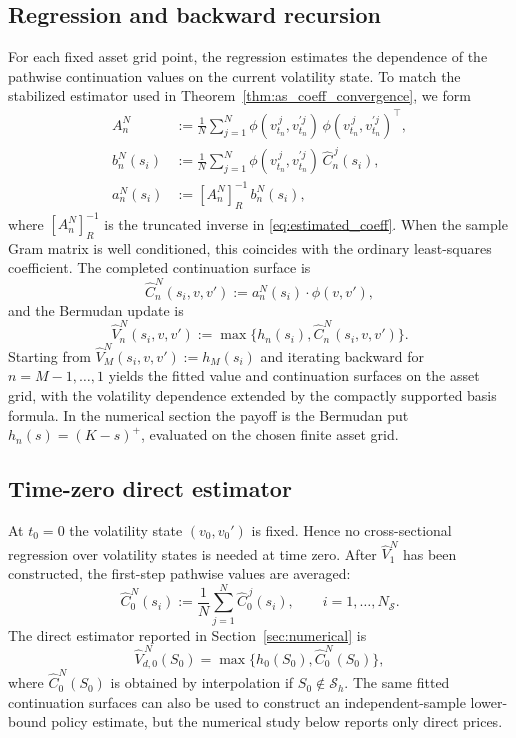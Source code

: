 \documentclass[pdflatex,sn-mathphys-num]{sn-jnl}
\theoremstyle{thmstyleone}%
\theoremstyle{thmstylethree}%
\theoremstyle{thmstyletwo}%
\begin{document}
\subsection{Regression and backward recursion}
For each fixed asset grid point, the regression estimates the dependence of the pathwise continuation values on the current volatility state. To match the stabilized estimator used in Theorem~\ref{thm:as_coeff_convergence}, we form
\begin{equation}
\begin{aligned}
A_n^N
&:=\frac1N\sum_{j=1}^N
\phi(v_{t_n}^{\,j},v_{t_n}^{\prime j})\,
\phi(v_{t_n}^{\,j},v_{t_n}^{\prime j})^\top,\\
b_n^N(s_i)
&:=\frac1N\sum_{j=1}^N
\phi(v_{t_n}^{\,j},v_{t_n}^{\prime j})\,\widehat C_n^{\,j}(s_i),\\
a_n^N(s_i)&:=[A_n^N]^{-1}_R\,b_n^N(s_i),
\end{aligned}
\label{eq:lsq}
\end{equation}
where $[A_n^N]^{-1}_R$ is the truncated inverse in \eqref{eq:estimated_coeff}. When the sample Gram matrix is well conditioned, this coincides with the ordinary least-squares coefficient.
The completed continuation surface is
\[
\widehat C_n^{N}(s_i,v,v'):=a_n^{N}(s_i)\cdot\phi(v,v'),
\]
and the Bermudan update is
\[
\widehat V_n^{N}(s_i,v,v')
:=\max\{h_n(s_i),\widehat C_n^{N}(s_i,v,v')\}.
\]
Starting from $\widehat V_M^{N}(s_i,v,v'):=h_M(s_i)$ and iterating backward for $n=M-1,\dots,1$ yields the fitted value and continuation surfaces on the asset grid, with the volatility dependence extended by the compactly supported basis formula. In the numerical section the payoff is the Bermudan put $h_n(s)=(K-s)^+$, evaluated on the chosen finite asset grid.

\subsection{Time-zero direct estimator}
At $t_0=0$ the volatility state $(v_0,v_0')$ is fixed. Hence no cross-sectional regression over volatility states is needed at time zero. After $\widehat V_1^N$ has been constructed, the first-step pathwise values are averaged:
\[
\widehat C_0^{N}(s_i):=\frac1N\sum_{j=1}^N\widehat C_0^{\,j}(s_i),
\qquad i=1,\dots,N_{\mathcal S}.
\]
The direct estimator reported in Section~\ref{sec:numerical} is
\[
\widehat V_{d,0}^{\,N}(S_0)
=
\max\{h_0(S_0),\widehat C_0^{N}(S_0)\},
\]
where $\widehat C_0^{N}(S_0)$ is obtained by interpolation if $S_0\notin\mathcal S_h$. The same fitted continuation surfaces can also be used to construct an independent-sample lower-bound policy estimate, but the numerical study below reports only direct prices.
\end{document}
